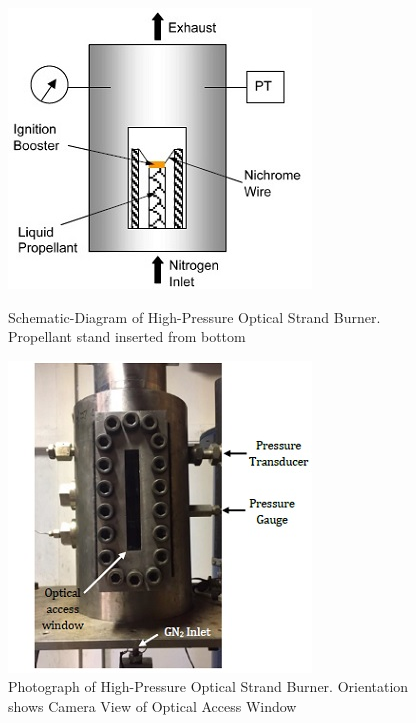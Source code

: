 \documentclass{article}
\begin{document}
\begin{figure}[htb!]
\centering
\begin{minipage}{0.45\textwidth}
\centering
\includegraphics[width=0.75\linewidth]{Figure_1.jpg}
\caption{Schematic-Diagram of High-Pressure Optical Strand Burner. Propellant stand inserted from bottom}
\label{fig1}
\end{minipage}%
\begin{minipage}{0.45\textwidth}
\centering
\includegraphics[width=0.75\linewidth]{Figure_2.jpg}
\caption{Photograph of High-Pressure Optical Strand Burner. Orientation shows Camera View of Optical Access Window}
\label{fig2}
\end{minipage}
\end{figure}
\end{document}
